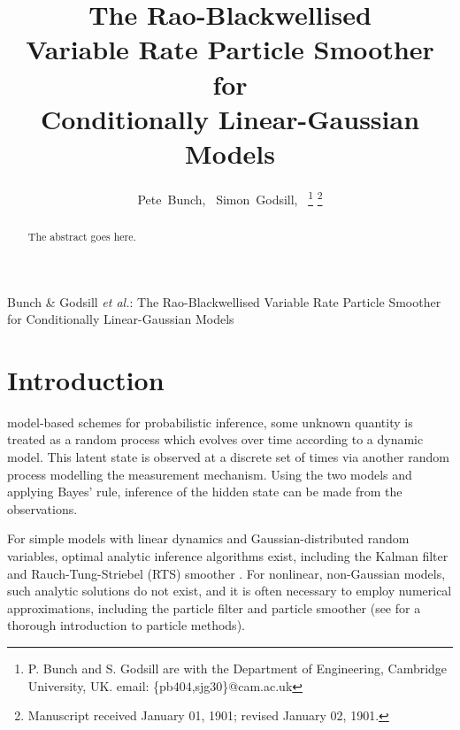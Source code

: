 \documentclass[journal]{IEEEtran}
\begin{document}
\title{The Rao-Blackwellised \\ Variable Rate Particle Smoother for \\ Conditionally Linear-Gaussian Models}

\author{Pete~Bunch,~\IEEEmembership{}
        Simon~Godsill,~%
\thanks{P. Bunch and S. Godsill are with the Department
of Engineering, Cambridge University, UK. email: \{pb404,sjg30\}@cam.ac.uk}%
\thanks{Manuscript received January 01, 1901; revised January 02, 1901.}}

%
{Bunch \& Godsill \MakeLowercase{\textit{et al.}}: The Rao-Blackwellised Variable Rate Particle Smoother for Conditionally Linear-Gaussian Models}

\maketitle

\begin{abstract}
The abstract goes here.
\end{abstract}

\begin{IEEEkeywords}

\end{IEEEkeywords}



\section{Introduction}
 model-based schemes for probabilistic inference, some unknown quantity is treated as a random process which evolves over time according to a dynamic model. This latent state is observed at a discrete set of times via another random process modelling the measurement mechanism. Using the two models and applying Bayes' rule, inference of the hidden state can be made from the observations.

For simple models with linear dynamics and Gaussian-distributed random variables, optimal analytic inference algorithms exist, including the Kalman filter \cite{Kalman1960} and Rauch-Tung-Striebel (RTS) smoother \cite{Rauch1965}. For nonlinear, non-Gaussian models, such analytic solutions do not exist, and it is often necessary to employ numerical approximations, including the particle filter \cite{Gordon1993} and particle smoother \cite{Doucet2000a,Godsill2004} (see \cite{Cappe2007,Doucet2009} for a thorough introduction to particle methods).
\end{document}

